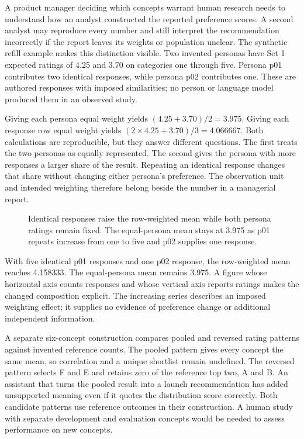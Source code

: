 \noindent \noindent A product manager deciding which concepts warrant human
research needs to understand how an analyst constructed the reported
preference scores. A second analyst may reproduce every number and still
interpret the recommendation incorrectly if the report leaves its
weights or population unclear. The synthetic refill example makes this
distinction visible. Two invented personas have Set 1 expected ratings
of 4.25 and 3.70 on categories one through five. Persona p01 contributes
two identical responses, while persona p02 contributes one. These are
authored responses with imposed similarities; no person or language
model produced them in an observed study.

Giving each persona equal weight yields \((4.25+3.70)/2=3.975\). Giving
each response row equal weight yields \((2\times4.25+3.70)/3=4.066667\).
Both calculations are reproducible, but they answer different questions.
The first treats the two personas as equally represented. The second
gives the persona with more responses a larger share of the result.
Repeating an identical response changes that share without changing
either persona's preference. The observation unit and intended weighting
therefore belong beside the number in a managerial report.

\begin{figure}[htbp]
\centering

\caption{Identical responses raise the row-weighted mean while both persona ratings remain fixed. The equal-persona mean stays at 3.975 as p01 repeats increase from one to five and p02 supplies one response.}\label{fig:M01_repeat_weights}
\end{figure}

With five identical p01 responses and one p02 response, the row-weighted
mean reaches 4.158333. The equal-persona mean remains 3.975. A figure
whose horizontal axis counts responses and whose vertical axis reports
ratings makes the changed composition explicit. The increasing series
describes an imposed weighting effect; it supplies no evidence of
preference change or additional independent information.

A separate six-concept construction compares pooled and reversed rating
patterns against invented reference counts. The pooled pattern gives
every concept the same mean, so correlation and a unique shortlist
remain undefined. The reversed pattern selects F and E and retains zero
of the reference top two, A and B. An assistant that turns the pooled
result into a launch recommendation has added unsupported meaning even
if it quotes the distribution score correctly. Both candidate patterns
use reference outcomes in their construction. A human study with
separate development and evaluation concepts would be needed to assess
performance on new concepts.

